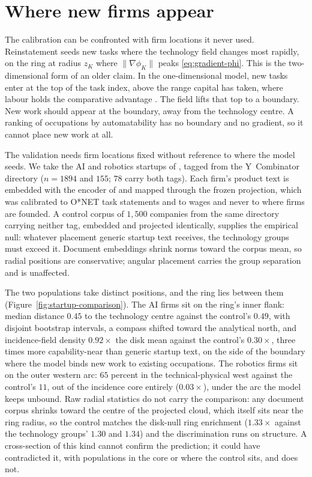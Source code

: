\documentclass[12pt, a4paper]{article}
\begin{document}
\section{Where new firms appear}
\label{sec:check-newwork}

The calibration can be confronted with firm locations it never used.
Reinstatement seeds new tasks where the technology field changes most
rapidly, on the ring at radius $z_K$ where $\|\nabla\phi_K\|$ peaks
\eqref{eq:gradient-phi}. This is the two-dimensional form of an
older claim. In the one-dimensional model, new tasks enter at the top of
the task index, above the range capital has taken, where labour holds
the comparative advantage
\parencite{acemoglu2018race,acemoglu2019automation}. The field lifts
that top to a boundary. New work should appear at the boundary, away
from the technology centre. A ranking of occupations by automatability
\parencite{frey2017, felten2021occupational} has no boundary and no
gradient, so it cannot place new work at all.

The validation needs firm locations fixed without reference to where
the model seeds. We take the AI and robotics startups of
\textcite{fenoaltea2026}, tagged from the Y~Combinator directory
($n=1894$ and $155$; $78$ carry both tags). Each firm's product text is
embedded with the encoder of \textcite{storck2026geometry} and mapped
through the frozen projection, which was calibrated to O*NET task
statements and to wages and never to where firms are founded. A control
corpus of $1{,}500$ companies from the same directory carrying neither
tag, embedded and projected identically, supplies the empirical null:
whatever placement generic startup text receives, the technology groups
must exceed it. Document embeddings shrink norms toward the corpus
mean, so radial positions are conservative; angular placement carries
the group separation and is unaffected.

The two populations take distinct positions, and the ring lies between
them (Figure~\ref{fig:startup-comparison}). The AI firms sit on the
ring's inner flank: median distance $0.45$ to the technology centre
against the control's $0.49$, with disjoint bootstrap intervals, a
compass shifted toward the analytical north, and incidence-field
density $0.92\times$ the disk mean against the control's $0.30\times$,
three times more capability-near than generic startup text, on the side
of the boundary where the model binds new work to existing occupations.
The robotics firms sit on the outer western arc: $65$ percent in the
technical-physical west against the control's $11$, out of the
incidence core entirely ($0.03\times$), under the arc the model keeps
unbound. Raw radial statistics do not carry the comparison: any
document corpus shrinks toward the centre of the projected cloud, which
itself sits near the ring radius, so the control matches the disk-null
ring enrichment ($1.33\times$ against the technology groups' $1.30$
and $1.34$) and the discrimination runs on structure. A cross-section
of this kind cannot confirm the prediction; it could have contradicted
it, with populations in the core or where the control sits, and does
not.
\end{document}
